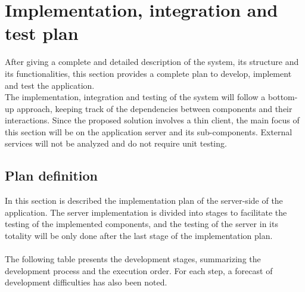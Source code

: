 \documentclass[10pt]{article} %
\begin{document}
\section{Implementation, integration and test plan}
After giving a complete and detailed description of the system, its structure and its functionalities, this section provides a complete plan to develop, implement and test the application.\\
The implementation, integration and testing of the system will follow a bottom-up approach, keeping track of the dependencies between components and their interactions.
Since the proposed solution involves a thin client, the main focus of this section will be on the application server and its sub-components. External services will not be analyzed and do not
require unit testing.
\subsection{Plan definition}
In this section is described the implementation plan of the server-side of the application. The server implementation is divided into stages to facilitate the testing of the implemented components, and the 
testing of the server in its totality will be only done after the last stage of the implementation plan.\\\\
The following table presents the development stages, summarizing the development process and the execution order. For each step, a forecast of development difficulties has also been noted.\\
\end{document}
